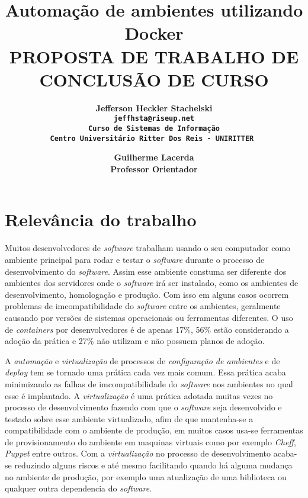 \documentclass[11pt,a4paper]{article}
\begin{document}
\title{Automação de ambientes utilizando Docker\\ \smallskip
\small{PROPOSTA DE TRABALHO DE CONCLUSÃO DE CURSO}}

\author{ \bf Jefferson Heckler Stachelski\\
  \tt jeffhsta@riseup.net \\
  Curso de Sistemas de Informação \\
  Centro Universitário Ritter Dos Reis - UNIRITTER
  \and
  \bf Guilherme Lacerda\\
  Professor Orientador\\
}

\maketitle
\thispagestyle{empty}

\section{Relevância do trabalho} \label{sec:intro}

Muitos desenvolvedores de \textit{software} trabalham usando o seu computador como ambiente principal para rodar e testar
o \textit{software} durante o processo de desenvolvimento do \textit{software}. Assim esse ambiente constuma ser diferente dos ambientes
dos servidores onde o \textit{software} irá ser instalado, como os ambientes de desenvolvimento, homologação e produção.
Com isso em alguns casos ocorrem problemas de imcompatibilidade do \textit{software} entre os ambientes, geralmente causando
por versões de sistemas operacionais ou ferramentas diferentes. O uso de \textit{containers} por desenvolvedores é de apenas
17\%, 56\% estão considerando a adoção da prática e 27\% não utilizam e não possuem planos de adoção\cite{DZone_CD_guide_v3}.

A \textit{automação} e \textit{virtualização} de processos de \textit{configuração de ambientes} e de \textit{deploy} tem
se tornado uma prática cada vez mais comum\cite{DZone_CD_guide_v3}. Essa prática acaba minimizando as falhas de
imcompatibilidade do \textit{software} nos ambientes no qual esse é implantado\cite{Fowler_continuos_integration}.
A \textit{virtualização} é uma prática adotada muitas vezes no processo de desenvolvimento fazendo com que o
\textit{software} seja desenvolvido e testado sobre esse ambiente virtualizado, afim de que mantenha-se a compatibilidade
com o ambiente de produção, em muitos casos usa-se ferramentas de provisionamento do ambiente em maquinas virtuais
como por exemplo \textit{Cheff}, \textit{Puppet} entre outros\cite{Fowler_infra_as_code}. Com a \textit{virtualização}
no processo de desenvolvimento acaba-se reduzindo alguns riscos e até mesmo facilitando quando há alguma mudança
no ambiente de produção, por exemplo uma atualização de uma biblioteca ou qualquer outra dependencia do
\textit{software}\cite{Fowler_continuos_integration}.
\end{document}
